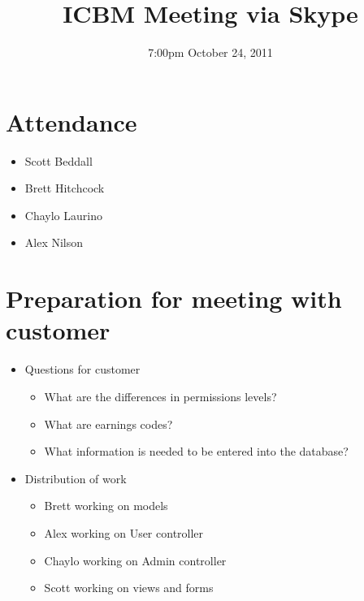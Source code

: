 \documentclass{article}
\begin{document}
\title{ICBM Meeting via Skype}
\date{7:00pm October 24, 2011}
\maketitle

\section{Attendance}
\begin{itemize}
\item Scott Beddall
\item Brett Hitchcock
\item Chaylo Laurino
\item Alex Nilson
\end{itemize}

\section{Preparation for meeting with customer}
\begin{itemize}
\item Questions for customer
	\begin{itemize}
	\item What are the differences in permissions levels?
	\item What are earnings codes?
	\item What information is needed to be entered into the database?
	\end{itemize}
\item Distribution of work
	\begin{itemize}
	\item Brett working on models
	\item Alex working on User controller
	\item Chaylo working on Admin controller
	\item Scott working on views and forms
	\end{itemize}
\end{itemize}
\end{document}
